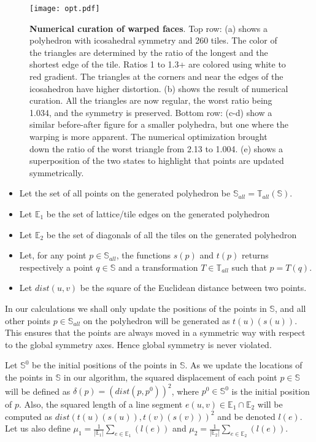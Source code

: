 \documentclass[11pt]{article}
\newcommand{\1}{\mathds{1}}
\begin{document}
\begin{figure}
\centering
\vspace{-0.5cm}
\texttt{[image: opt.pdf]}
\vspace{-0.5cm}
\caption[Numerical curation of warped faces]{ \textbf{Numerical curation of warped faces}. Top row: (a) shows a polyhedron with icosahedral symmetry and 260 tiles. The color of the triangles are determined by the ratio of the longest and the shortest edge of the tile. Ratios 1 to 1.3+ are colored using white to red gradient. The triangles at the corners and near the edges of the icosahedron have higher distortion. (b) shows the result of numerical curation. All the triangles are now regular, the worst ratio being 1.034, and the symmetry is preserved. Bottom row: (c-d) show a similar before-after figure for a smaller polyhedra, but one where the warping is more apparent. The numerical optimization brought down the ratio of the worst triangle from 2.13 to 1.004. (e) shows a superposition of the two states to highlight that points are updated symmetrically.}
\label{fig:assemblytheory:demo3}
\vspace{-0.5cm}
\end{figure}

\begin{itemize}
 \item Let the set of all points on the generated polyhedron be $\mathbb{S}_{all} = \mathbb{T}_{all}(\mathbb{S})$.
 \item Let $\mathbb{E}_1$ be the set of lattice/tile edges on the generated polyhedron
 \item Let $\mathbb{E}_2$ be the set of diagonals of all the tiles on the generated polyhedron
 \item Let, for any point $p \in \mathbb{S}_{all}$, the functions $s(p)$ and $t(p)$ returns respectively a point $q \in \mathbb{S}$ and a transformation $T \in \mathbb{T}_{all}$ such that $p = T(q)$.
 \item Let $dist(u,v)$ be the square of the Euclidean distance between two points.
\end{itemize}

In our calculations we shall only update the positions of the points in $\mathbb{S}$, and all other points $p \in \mathbb{S}_{all}$ on the polyhedron will be generated as $t(u)(s(u))$. This ensures that the points are always moved in a symmetric way with respect to the global symmetry axes. Hence global symmetry is never violated.

Let $\mathbb{S}^0$ be the initial positions of the points in $\mathbb{S}$. As we update the locations of the points in $\mathbb{S}$ in our algorithm, the squared displacement of each point $p \in \mathbb{S}$ will be defined as $\delta(p) = (dist(p,p^0))^2$, where $p^0 \in \mathbb{S}^0$ is the initial position of $p$. Also, the squared length of a line segment $e(u,v) \in \mathbb{E}_1 \cap \mathbb{E}_2$ will be computed as $dist(t(u)(s(u)),t(v)(s(v)))^2$ and be denoted $l(e)$. Let us also define $\mu_1 = \frac{1}{|\mathbb{E}_1|} \sum_{e \in \mathbb{E}_1} (l(e))$ and $\mu_2 = \frac{1}{|\mathbb{E}_2|} \sum_{e \in \mathbb{E}_2} (l(e))$. 
\end{document}
